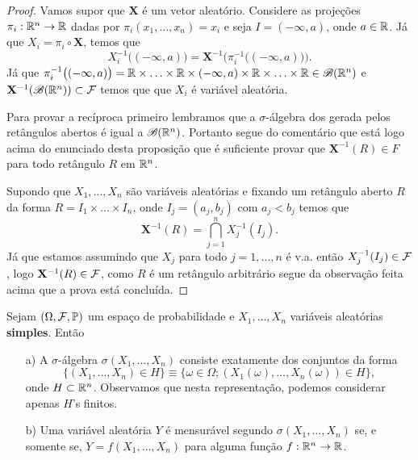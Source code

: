 \begin{proof}
Vamos supor que $\mathbf{X}$ é um vetor aleatório.
Considere as projeções $\pi_i:\mathbb{R}^n\to \mathbb{R}$ dadas por 
$\pi_i(x_1,\ldots,x_n)=x_i$ e seja $I=(-\infty,a)$,
onde $a\in\mathbb{R}$. Já que $X_i = \pi_i\circ \mathbf{X}$,
temos que 
\[
	X_i^{-1}\big((-\infty,a)\big) 
	= 
	\mathbf{X}^{-1}\Big( \pi_i^{-1}\big( (-\infty,a)\big)\Big).
\]
Já que 
$\pi_i^{-1}\big( (-\infty,a)\big)
 = 
 \mathbb{R}\times\ldots\times\mathbb{R}\times (-\infty,a)\times\mathbb{R}\times\ldots\times\mathbb{R}
 \in
 \mathscr{B}(\mathbb{R}^n)
$
e $\mathbf{X}^{-1}(\mathscr{B}(\mathbb{R}^n))\subset \mathcal{F}$ temos que 
que $X_i$ é variável aleatória.

Para provar a recíproca primeiro lembramos que
a $\sigma$-álgebra dos gerada pelos 
retângulos abertos é igual a $\mathscr{B}(\mathbb{R}^n)$. Portanto 
segue do comentário que está logo acima do enunciado
desta proposição que é suficiente provar que 
$\mathbf{X}^{-1}(R)\in F$ para todo retângulo $R$ em 
$\mathbb{R}^n$. 

Supondo que $X_1,\ldots,X_n$ são variáveis aleatórias e 
fixando um retângulo aberto $R$ da forma 
$R=I_1\times\ldots\times I_n$, onde $I_j=(a_j,b_j)$ com $a_j<b_j$
temos que 
	\[
	\mathbf{X}^{-1}(R) 
	= 
	\bigcap_{j=1}^n X_j^{-1}(I_j).
	\]	
Já que estamos assumindo que 
$X_j$ para todo $j=1,\ldots,n$ é v.a.
então $X_j^{-1}(I_j)\in \mathcal{F}$, logo $\mathbf{X}^{-1}(R)\in \mathcal{F}$,
como $R$ é um retângulo arbitrário segue da observação feita 
acima que a prova está concluída.
\end{proof}





\begin{teorema}
Sejam $(\Omega,\mathcal{F},\mathbb{P})$ um espaço de probabilidade
e $X_1,\ldots,X_n$ variáveis aleatórias {\bf simples}. Então
\begin{itemize}
	\item[a)]
	A $\sigma$-álgebra $\sigma(X_1,\ldots,X_n)$ 
	consiste exatamente dos conjuntos da forma
	\[
		\{(X_1,\ldots,X_n)\in H\} 
		\equiv
		\{\omega\in\Omega; (X_1(\omega),\ldots,X_n(\omega))\in H\},
	\]
	onde $H\subset \mathbb{R}^n$. 
	Observamos que nesta representação, 
	podemos considerar apenas $H$'s finitos.
	
	\item[b)]
	Uma variável aleatória $Y$ é mensurável segundo 
	$\sigma(X_1,\ldots,X_n)$ se, e somente se,
	$Y=f(X_1,\ldots,X_n)$ para alguma função 
	$f:\mathbb{R}^n\to\mathbb{R}$.	
\end{itemize}
\end{teorema}


